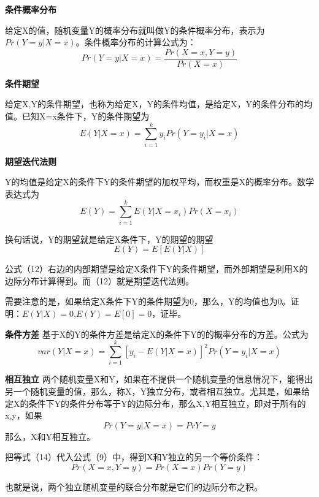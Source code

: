 \documentclass[cn,12pt,math=newtx,citestyle=gb7714-2015,bibstyle=gb7714-2015]{elegantbook}
\begin{document}
	\textbf{条件概率分布}
	
	给定X的值，随机变量Y的概率分布就叫做Y的条件概率分布，表示为$Pr(Y=y|X=x)$。条件概率分布的计算公式为：
	\begin{equation}
		Pr(Y=y|X=x)=\frac{Pr(X=x,Y=y)}{Pr(X=x)}
	\end{equation}
	
	\textbf{条件期望}
	
	给定X,Y的条件期望，也称为给定X，Y的条件均值，是给定X，Y的条件分布的均值。已知X=x条件下，Y的条件期望为
	\begin{equation}
		E(Y|X=x)=\sum_{i=1}^{k}{y_iPr(Y=y_i|X=x)}
	\end{equation}
	
	\textbf{期望迭代法则}
	
	Y的均值是给定X的条件下Y的条件期望的加权平均，而权重是X的概率分布。数学表达式为
	\begin{equation}
		E(Y)=\sum_{i=1}^{k}{E(Y|X=x_i)Pr(X=x_i)}
	\end{equation}
	
	换句话说，Y的期望就是给定X条件下，Y的期望的期望
	\begin{equation}
		E(Y)=E[E(Y|X)]
	\end{equation}
	
	公式（12）右边的内部期望是给定X条件下Y的条件期望，而外部期望是利用X的边际分布计算得到。而（12）就是期望迭代法则。
	
	需要注意的是，如果给定X条件下Y的条件期望为0，那么，Y的均值也为0。证明：$E(Y|X)=0$,$E(Y)=E[0]=0$，证毕。
	
	\textbf{条件方差}
	基于X的Y的条件方差是给定X的条件下Y的的概率分布的方差。公式为
	\begin{equation}
		var(Y|X=x)=\sum_{i=1}^{k}{[y_i-E(Y|X=x)]^2Pr(Y=y_i|X=x)}
	\end{equation}
	
	\textbf{相互独立}
	两个随机变量X和Y，如果在不提供一个随机变量的信息情况下，能得出另一个随机变量的值，那么，称X，Y独立分布，或者相互独立。尤其是，如果给定X的条件下Y的条件分布等于Y的边际分布，那么X,Y相互独立，即对于所有的x,y，如果
	\begin{equation}
		Pr(Y=y|X=x)=Pr{Y=y}
	\end{equation}
	那么，X和Y相互独立。
	
	把等式（14）代入公式（9）中，得到X和Y独立的另一个等价条件：\begin{equation}
		Pr(X=x,Y=y)=Pr(X=x)Pr(Y=y)
	\end{equation}
	
	也就是说，两个独立随机变量的联合分布就是它们的边际分布之积。
	
\end{document}
